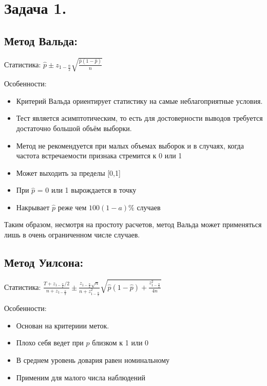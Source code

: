 \documentclass[10pt,reqno]{amsart}
\theoremstyle{definition}
\theoremstyle{remark}
\begin{document}
\section*{Задача 1.}

\subsection*{Метод Вальда:}


Статистика: $\widehat{p} \pm z_{1 - \frac{\alpha}{2}} \sqrt{\frac{\widehat{p}(1 - \widehat{p})}{n}}$

Особенности:
\begin{itemize}
\item Критерий Вальда ориентирует статистику на самые неблагоприятные условия.
\item Тест является асимптотическим, то есть для достоверности выводов требуется достаточно большой объём выборки.
\item Метод не рекомендуется при малых объемах выборок и в случаях, когда частота встречаемости признака стремится к 0 или 1
\item Может выходить за пределы [0,1]
\item При $\widehat{p}$ = 0 или 1 вырождается в точку
\item Накрывает $\widehat{p}$  реже чем $100(1 - a)\%$ случаев
\end{itemize}

Таким образом, несмотря на простоту расчетов, метод Вальда может применяться лишь в очень ограниченном числе случаев.


\subsection*{Метод Уилсона:}

Статистика: $\frac{T + z_{1 - \frac{\alpha}{2}} / 2}{n + z_{1 - \frac{\alpha}{2}}} \pm \frac{z_{1 - \frac{\alpha}{2}} \sqrt{n}}{n + z^2_{1 - \frac{\alpha}{2}}}\sqrt{\widehat{p}(1 - \widehat{p}) + \frac{z^2_{1 - \frac{\alpha}{2}}}{4n}}$


Особенности:
\begin{itemize}
\item Основан на критериии меток.
\item Плохо себя ведет при $\widehat{p}$ близком к 1 или 0
\item В среднем уровень довария равен номинальному
\item Применим для малого числа наблюдений
\end{itemize}
\end{document}
